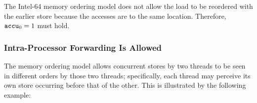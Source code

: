 \begin{table}[!hbt]
\noindent{}
\caption[Loads Are not Reordered with Older Stores to the Same Location]{Loads Are not Reordered with Older Stores to the Same Location \cite[Example 8-4]{ref:Intel}}
\label{tbl:litmus:intel:4}
\end{table}

\noindent
The Intel-64 memory ordering model does not allow the load to be reordered with the earlier store because the accesses are to the same location.
Therefore, $\texttt{accu}_0 = 1$ must hold.

\newpage

\subsubsection*{Intra-Processor Forwarding Is Allowed}

The memory ordering model allows concurrent stores by two threads to be seen in different orders by those two threads; specifically, each thread may perceive its own store occurring before that of the other.
This is illustrated by the following example:

